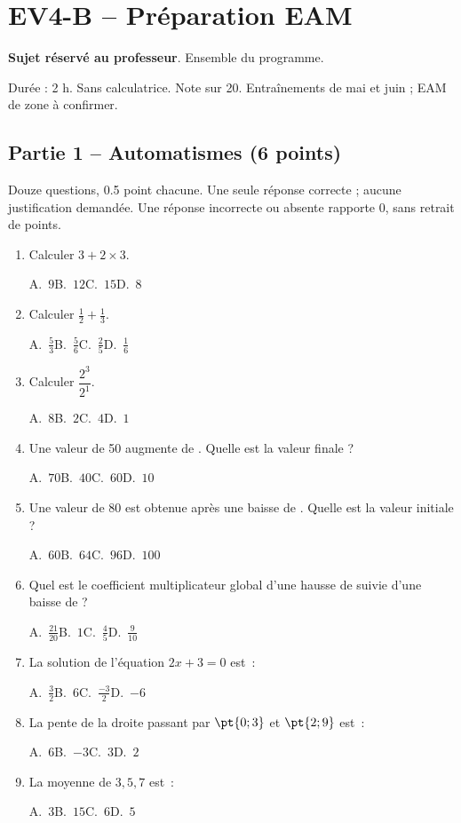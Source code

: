 \mxnewpage\section*{EV4-B -- Préparation EAM}\label{EV4-B}
\textbf{Sujet réservé au professeur}. Ensemble du programme.\par Durée : 2 h. Sans calculatrice. Note sur 20. Entraînements de mai et juin ; EAM de zone à confirmer.
\subsection*{Partie 1 -- Automatismes (6 points)}
Douze questions, \num{0,5} point chacune. Une seule réponse correcte ; aucune justification demandée. Une réponse incorrecte ou absente rapporte 0, sans retrait de points.
\begin{enumerate}
\item Calculer $3+2\times3$.\par A.~$9$\quad B.~$12$\quad C.~$15$\quad D.~$8$
\item Calculer $\frac12+\frac13$.\par A.~$\frac{5}{3}$\quad B.~$\frac{5}{6}$\quad C.~$\frac{2}{5}$\quad D.~$\frac{1}{6}$
\item Calculer $\dfrac{2^3}{2^{1}}$.\par A.~$8$\quad B.~$2$\quad C.~$4$\quad D.~$1$
\item Une valeur de 50 augmente de . Quelle est la valeur finale ?\par A.~$70$\quad B.~$40$\quad C.~$60$\quad D.~$10$
\item Une valeur de 80 est obtenue après une baisse de . Quelle est la valeur initiale ?\par A.~$60$\quad B.~$64$\quad C.~$96$\quad D.~$100$
\item Quel est le coefficient multiplicateur global d’une hausse de  suivie d’une baisse de  ?\par A.~$\frac{21}{20}$\quad B.~$1$\quad C.~$\frac{4}{5}$\quad D.~$\frac{9}{10}$
\item La solution de l’équation $2x+3=0$ est~:\par A.~$\frac{3}{2}$\quad B.~$6$\quad C.~$\frac{-3}{2}$\quad D.~$-6$
\item La pente de la droite passant par $\pt{0;3}$ et $\pt{2;9}$ est~:\par A.~$6$\quad B.~$-3$\quad C.~$3$\quad D.~$2$
\item La moyenne de $3, 5, 7$ est~:\par A.~$3$\quad B.~$15$\quad C.~$6$\quad D.~$5$

\end{enumerate}
